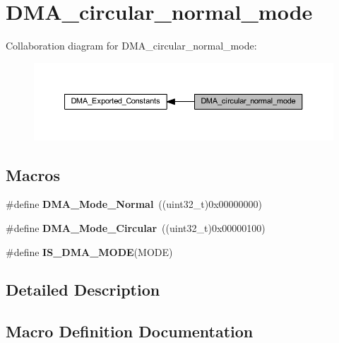 \hypertarget{group___d_m_a__circular__normal__mode}{}\section{D\+M\+A\+\_\+circular\+\_\+normal\+\_\+mode}
\label{group___d_m_a__circular__normal__mode}
Collaboration diagram for D\+M\+A\+\_\+circular\+\_\+normal\+\_\+mode\+:\nopagebreak
\begin{figure}[H]
\begin{center}
\leavevmode
\includegraphics[width=350pt]{group___d_m_a__circular__normal__mode}
\end{center}
\end{figure}
\subsection*{Macros}
\begin{DoxyCompactItemize}
\item 
\mbox{\label{group___d_m_a__circular__normal__mode_ga36400f5b5095f1102ede4760d7a5959c}} 
\#define {\bfseries D\+M\+A\+\_\+\+Mode\+\_\+\+Normal}~((uint32\+\_\+t)0x00000000)
\item 
\mbox{\label{group___d_m_a__circular__normal__mode_ga36327b14c302098fbc5823ac3f1ae020}} 
\#define {\bfseries D\+M\+A\+\_\+\+Mode\+\_\+\+Circular}~((uint32\+\_\+t)0x00000100)
\item 
\#define {\bfseries I\+S\+\_\+\+D\+M\+A\+\_\+\+M\+O\+DE}(M\+O\+DE)
\end{DoxyCompactItemize}


\subsection{Detailed Description}


\subsection{Macro Definition Documentation}
\mbox{\label{group___d_m_a__circular__normal__mode_gad88ee5030574d6a573904378fb62c7ac}} 
